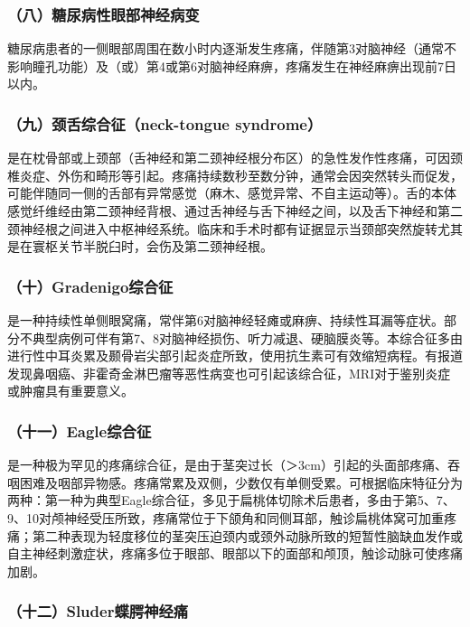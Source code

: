 \subsubsection{（八）糖尿病性眼部神经病变}

糖尿病患者的一侧眼部周围在数小时内逐渐发生疼痛，伴随第3对脑神经（通常不影响瞳孔功能）及（或）第4或第6对脑神经麻痹，疼痛发生在神经麻痹出现前7日以内。

\subsubsection{（九）颈舌综合征（neck-tongue syndrome）}

是在枕骨部或上颈部（舌神经和第二颈神经根分布区）的急性发作性疼痛，可因颈椎炎症、外伤和畸形等引起。疼痛持续数秒至数分钟，通常会因突然转头而促发，可能伴随同一侧的舌部有异常感觉（麻木、感觉异常、不自主运动等）。舌的本体感觉纤维经由第二颈神经背根、通过舌神经与舌下神经之间，以及舌下神经和第二颈神经根之间进入中枢神经系统。临床和手术时都有证据显示当颈部突然旋转尤其是在寰枢关节半脱臼时，会伤及第二颈神经根。

\subsubsection{（十）Gradenigo综合征}

是一种持续性单侧眼窝痛，常伴第6对脑神经轻瘫或麻痹、持续性耳漏等症状。部分不典型病例可伴有第7、8对脑神经损伤、听力减退、硬脑膜炎等。本综合征多由进行性中耳炎累及颞骨岩尖部引起炎症所致，使用抗生素可有效缩短病程。有报道发现鼻咽癌、非霍奇金淋巴瘤等恶性病变也可引起该综合征，MRI对于鉴别炎症或肿瘤具有重要意义。

\subsubsection{（十一）Eagle综合征}

是一种极为罕见的疼痛综合征，是由于茎突过长（＞3cm）引起的头面部疼痛、吞咽困难及咽部异物感。疼痛常累及双侧，少数仅有单侧受累。可根据临床特征分为两种：第一种为典型Eagle综合征，多见于扁桃体切除术后患者，多由于第5、7、9、10对颅神经受压所致，疼痛常位于下颌角和同侧耳部，触诊扁桃体窝可加重疼痛；第二种表现为轻度移位的茎突压迫颈内或颈外动脉所致的短暂性脑缺血发作或自主神经刺激症状，疼痛多位于眼部、眼部以下的面部和颅顶，触诊动脉可使疼痛加剧。

\subsubsection{（十二）Sluder蝶腭神经痛}

